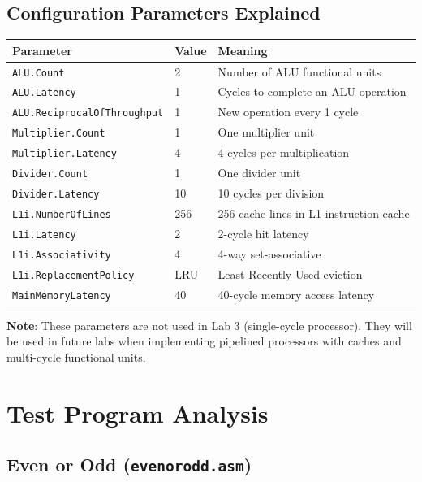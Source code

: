 \documentclass[12pt,a4paper]{article}
\begin{document}
\subsection{Configuration Parameters Explained}

\begin{longtable}{p{5cm}p{2cm}p{6cm}}
\toprule
\textbf{Parameter} & \textbf{Value} & \textbf{Meaning} \\
\midrule
\texttt{ALU.Count} & 2 & Number of ALU functional units \\
\texttt{ALU.Latency} & 1 & Cycles to complete an ALU operation \\
\texttt{ALU.ReciprocalOfThroughput} & 1 & New operation every 1 cycle \\
\texttt{Multiplier.Count} & 1 & One multiplier unit \\
\texttt{Multiplier.Latency} & 4 & 4 cycles per multiplication \\
\texttt{Divider.Count} & 1 & One divider unit \\
\texttt{Divider.Latency} & 10 & 10 cycles per division \\
\texttt{L1i.NumberOfLines} & 256 & 256 cache lines in L1 instruction cache \\
\texttt{L1i.Latency} & 2 & 2-cycle hit latency \\
\texttt{L1i.Associativity} & 4 & 4-way set-associative \\
\texttt{L1i.ReplacementPolicy} & LRU & Least Recently Used eviction \\
\texttt{MainMemoryLatency} & 40 & 40-cycle memory access latency \\
\bottomrule
\end{longtable}

\textbf{Note}: These parameters are not used in Lab 3 (single-cycle processor). They will be used in future labs when implementing pipelined processors with caches and multi-cycle functional units.

\section{Test Program Analysis}

\subsection{Even or Odd (\texttt{evenorodd.asm})}
\end{document}
